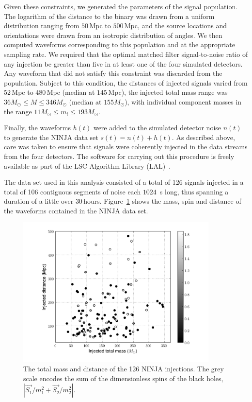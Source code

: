 Given these constraints, we generated the parameters of the signal
population.  The logarithm of the distance to the binary was drawn
from a uniform distribution ranging from $50\,$Mpc to $500\,$Mpc, and
the source locations and orientations were drawn from an isotropic
distribution of angles.  We then computed waveforms corresponding to
this population and at the appropriate sampling rate. We required that
the optimal matched filter signal-to-noise ratio of any injection be
greater than five in at least one of the four simulated detectors.
Any waveform that did not satisfy this constraint was discarded from
the population.  Subject to this condition, the distances of injected
signals varied from $52\,$Mpc to $480\,$Mpc (median at $145\,$Mpc),
the injected total mass range was $36M_\odot \le M \le346M_\odot$
(median at $155 M_\odot$), with individual component masses in the
range $11 M_\odot \le m_i \le193M_\odot$.  

Finally, the waveforms $h(t)$ were added to the simulated detector noise
$n(t)$ to generate the NINJA data set $s(t) = n(t) + h(t)$. As described
above, care was taken to ensure that signals were coherently injected in the
data streams from the four detectors.  The software for carrying out this
procedure is freely available as part of the LSC Algorithm Library
(LAL)~\cite{lal}.

The data set used in this analysis consisted of a total of 126 signals
injected in a total of 106 contiguous segments of noise each $1024\,$ s
long, thus spanning a duration of a little over $30\,$hours.
Figure~\ref{fig:distvsmass} shows the mass, spin and distance of the waveforms
contained in the NINJA data set.
\begin{figure}
  \begin{center}
  \includegraphics[width=0.9\textwidth]{figures/ninja1/DistanceVsMass_injected_withSpins}
  \end{center}
  \caption[Distribution of NINJA1 injections]{The total mass and distance of the 126 NINJA injections. The
    grey scale encodes the sum of the dimensionless spins of the black holes, 
$|\vec{S_1}/m_1^2 + \vec{S_2}/m_2^2|$.}
  \label{fig:distvsmass}
\end{figure}


